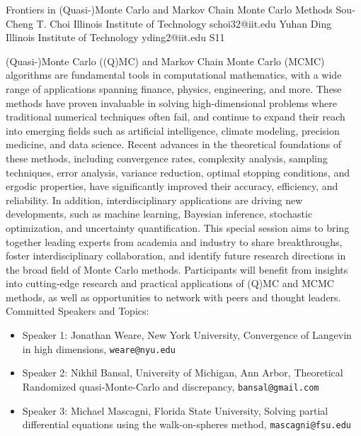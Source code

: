 \begin{session}
 {Frontiers in (Quasi-)Monte Carlo and Markov Chain Monte Carlo Methods}%
 {Sou-Cheng T.  Choi}%
 {Illinois Institute of Technology}%
 {schoi32@iit.edu}%
 {Yuhan Ding}%
 {Illinois Institute of Technology}%
 {yding2@iit.edu}%
 {S11}%
{}

 (Quasi-)Monte Carlo ((Q)MC) and Markov Chain Monte Carlo (MCMC) algorithms are fundamental tools in computational mathematics, with a wide range of applications spanning finance, physics, engineering, and more. These methods have proven invaluable in solving high-dimensional problems where traditional numerical techniques often fail, and continue to expand their reach into emerging fields such as artificial intelligence, climate modeling, precision medicine, and data science.
 Recent advances in the theoretical foundations of these methods, including convergence rates, complexity analysis, sampling techniques, error analysis, variance reduction, optimal stopping conditions, and ergodic properties, have significantly improved their accuracy, efficiency, and reliability. In addition, interdisciplinary applications are driving new developments, such as machine learning, Bayesian inference, stochastic optimization, and uncertainty quantification.
 This special session aims to bring together leading experts from academia and industry to share breakthroughs, foster interdisciplinary collaboration, and identify future research directions in the broad field of Monte Carlo methods. Participants will benefit from insights into cutting-edge research and practical applications of (Q)MC and MCMC methods, as well as opportunities to network with peers and thought leaders.
 Committed Speakers and Topics:
 \begin{itemize}
 \item Speaker 1: Jonathan Weare, New York University, Convergence of Langevin in high dimensions, \texttt{weare@nyu.edu}
 \item Speaker 2: Nikhil Bansal, University of Michigan, Ann Arbor, Theoretical Randomized quasi-Monte-Carlo and discrepancy, \texttt{bansal@gmail.com}
 \item Speaker 3: Michael Mascagni, Florida State University, Solving partial differential equations using the walk-on-spheres method, \texttt{mascagni@fsu.edu}

\end{itemize}
\end{session}
